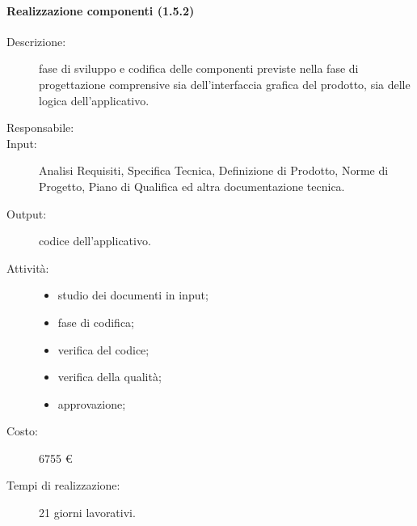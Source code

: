 \paragraph{Realizzazione componenti (1.5.2)}
\begin{description}
\item[Descrizione:] fase di sviluppo e codifica delle componenti previste nella fase di progettazione comprensive sia dell'interfaccia grafica del prodotto, sia delle logica dell'applicativo.
\item[Responsabile:] 
\item[Input:] Analisi Requisiti, Specifica Tecnica, Definizione di Prodotto, Norme di Progetto, Piano di Qualifica ed altra documentazione tecnica.
\item[Output:] codice dell'applicativo.
\item[Attivit\`{a}:] 
\begin{center}
\begin{itemize}
\item studio dei documenti in input;
\item fase di codifica;
\item verifica del codice;
\item verifica della qualit\`{a};
\item approvazione;
\end{itemize}
\end{center}
\item[Costo:] 6755 \euro{}
\item[Tempi di realizzazione:] 21 giorni lavorativi.
\end{description}

